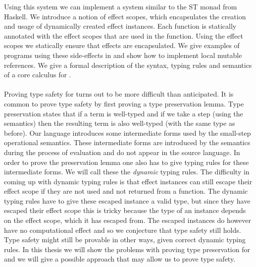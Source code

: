 Using this system we can implement a system similar to the ST monad from Haskell.
We introduce a notion of effect scopes, which encapsulates the creation and usage of dynamically created effect instances.
Each function is statically annotated with the effect scopes that are used in the function.
Using the effect scopes we statically ensure that effects are encapsulated.
We give examples of programs using these side-effects in \lang{} and show how to implement local mutable references.
We give a formal description of the syntax, typing rules and semantics of a core calculus for \lang{}.
\\\\
Proving type safety for \lang{} turns out to be more difficult than anticipated.
It is common to prove type safety by first proving a type preservation lemma.
Type preservation states that if a term is well-typed and if we take a step (using the semantics) then the resulting term is also well-typed (with the same type as before).
Our language introduces some intermediate forms used by the small-step operational semantics.
These intermediate forms are introduced by the semantics during the process of evaluation and do not appear in the source language.
In order to prove the preservation lemma one also has to give typing rules for these intermediate forms.
We will call these the \emph{dynamic} typing rules.
The difficulty in coming up with dynamic typing rules is that effect instances can still escape their effect scope if they are not used and not returned from a function.
The dynamic typing rules have to give these escaped instance a valid type, but since they have escaped their effect scope this is tricky because the type of an instance depends on the effect scope, which it has escaped from.
The escaped instances do however have no computational effect and so we conjecture that type safety still holds.
Type safety might still be provable in other ways, given correct dynamic typing rules.
In this thesis we will show the problems with proving type preservation for \lang{} and we will give a possible approach that may allow us to prove type safety.

